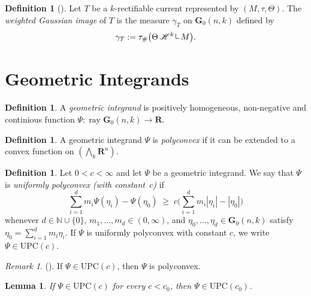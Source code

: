 \documentclass[a4paper,twoside,reqno]{article}
\theoremstyle{definition}
\theoremstyle{remark}
\theoremstyle{plain}
\newtheorem{lemma}[theorem]{Lemma}
\theoremstyle{remark}
\newtheorem{remark}[theorem]{Remark}
\theoremstyle{definition}
\newtheorem{definition}[theorem]{Definition}
\newcommand{\ograss}[2]{\mathbf{G}_0(#1,#2)}
\newcommand{\natp}{\mathbb{N}}
\newcommand{\nat}{\natp \cup \{0\}}
\newcommand{\UPC}{\mathrm{UPC}}
\newcommand{\R}{\mathbf{R}}
\newcommand{\HM}{\mathscr{H}}
\newcommand{\restrict}{ \mathop{ \rule[1pt]{.5pt}{6pt} \rule[1pt]{4pt}{0.5pt} }\nolimits }
\newcommand{\tbwedge}{{\textstyle \boldsymbol{\bigwedge}}}
\DeclareMathOperator{\ray}{ray}
\begin{document}
\begin{definition}[]
    Let $T$ be a $k$-rectifiable current represented by $(M,\tau,\Theta)$.
    The \emph{weighted Gaussian image} of $T$ is the measure $\gamma_T$ on
    $\ograss{n}{k}$ defined by
    \[
        \gamma_T := \tau_{\#}\bigl(\Theta\, \HM^k \restrict M\bigr).
    \]
\end{definition}

\section{Geometric Integrands}\label{section:geom_integrands}

\begin{definition}
    A \emph{geometric integrand} is positively homogeneous, non-negative and
    continious function $\Psi : \ray \ograss{n}{k} \to \R$.
\end{definition}

\begin{definition}
    A geometric integrand $\Psi$ is \emph{polyconvex} if it can be extended to a
    convex function on $(\tbwedge_k \R^n)$.
\end{definition}

\begin{definition}
    \label{def:upolyconvexity}
    Let $0 < c < \infty$ and let $\Psi$ be a geometric integrand.
    We say that $\Psi$ is \emph{uniformly polyconvex (with constant~$c$)} if
    \[
        \sum_{i=1}^{d} m_i \Psi(\eta_i) - \Psi(\eta_0)
        \;\ge\;
        c \bigl( \sum_{i=1}^{d} m_i |\eta_i| - |\eta_0| \bigr)
    \]
    whenever $d \in \nat$, $m_1,\ldots,m_d \in (0,\infty)$, and
    $\eta_0,\ldots,\eta_d \in \ograss{n}{k}$ satisfy
    $\eta_0 = \sum_{i=1}^{d} m_i \eta_i$.
    If $\Psi$ is uniformly polyconvex with constant $c$, we write
    $\Psi \in \UPC(c)$.
\end{definition}

\begin{remark}
    (\cite[3.22]{Lesniak_2025}). If $\Psi \in \UPC(c)$, then $\Psi$ is
    polyconvex.
\end{remark}

\begin{lemma}\label{lemma:upc_upc}
If $\Psi\in\UPC(c)$ for every $c<c_0$, then $\Psi\in\UPC(c_0)$.
\end{lemma}
\end{document}
